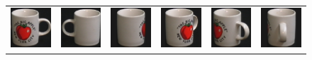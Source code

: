 \begin{figure}[p]
\begin{tabular}{cccccc}
\includegraphics[width=2cm]{coil/beeld-36.eps} &
\includegraphics[width=2cm]{coil/beeld-37.eps} &
\includegraphics[width=2cm]{coil/beeld-38.eps} &
\includegraphics[width=2cm]{coil/beeld-39.eps} &
\includegraphics[width=2cm]{coil/beeld-40.eps} &
\includegraphics[width=2cm]{coil/beeld-41.eps} \\


\end{tabular}
\end{figure}
